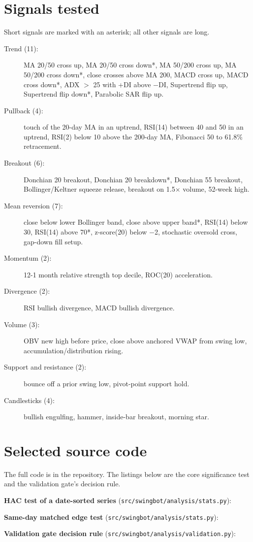 \documentclass[11pt]{article}
\begin{document}



\appendix
\section{Signals tested}\label{app:signals}
\small
Short signals are marked with an asterisk; all other signals are long.
\begin{description}
\item[Trend (11):] MA 20/50 cross up, MA 20/50 cross down*, MA 50/200 cross up, MA 50/200 cross
down*, close crosses above MA 200, MACD cross up, MACD cross down*, ADX $>$ 25 with +DI above
$-$DI, Supertrend flip up, Supertrend flip down*, Parabolic SAR flip up.
\item[Pullback (4):] touch of the 20-day MA in an uptrend, RSI(14) between 40 and 50 in an uptrend,
RSI(2) below 10 above the 200-day MA, Fibonacci 50 to 61.8\% retracement.
\item[Breakout (6):] Donchian 20 breakout, Donchian 20 breakdown*, Donchian 55 breakout,
Bollinger/Keltner squeeze release, breakout on 1.5$\times$ volume, 52-week high.
\item[Mean reversion (7):] close below lower Bollinger band, close above upper band*, RSI(14) below
30, RSI(14) above 70*, z-score(20) below $-$2, stochastic oversold cross, gap-down fill setup.
\item[Momentum (2):] 12-1 month relative strength top decile, ROC(20) acceleration.
\item[Divergence (2):] RSI bullish divergence, MACD bullish divergence.
\item[Volume (3):] OBV new high before price, close above anchored VWAP from swing low,
accumulation/distribution rising.
\item[Support and resistance (2):] bounce off a prior swing low, pivot-point support hold.
\item[Candlesticks (4):] bullish engulfing, hammer, inside-bar breakout, morning star.
\end{description}

\section{Selected source code}
The full code is in the repository. The listings below are the core significance test and the
validation gate's decision rule.

\noindent\textbf{HAC test of a date-sorted series} (\texttt{src/swingbot/analysis/stats.py}):


\noindent\textbf{Same-day matched edge test} (\texttt{src/swingbot/analysis/stats.py}):


\noindent\textbf{Validation gate decision rule} (\texttt{src/swingbot/analysis/validation.py}):

\end{document}
